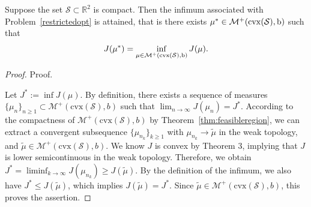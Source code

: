 \documentclass[stsy,sglanonrev]{informs4}
\newcommand{\death}{{\beta}}
\begin{document}
\begin{theorem}\label{thm:existence} Suppose the set $\mathcal{S} \subset \mathbb{R}^2$ is compact. Then the infimum associated with Problem~\eqref{restrictedopt} is attained, that is there exists $\mu^* \in \mathcal{M}^+(\rm{cvx}(\mathcal{S}),b)$ such that $$J(\mu^*) = \inf_{\mu \in \mathcal{M}^+(\rm{cvx}(\mathcal{S}),b)} J(\mu).$$

\end{theorem}
\begin{proof}{Proof.} 

Let \( J^* := \inf J(\mu) \). By definition, there exists a sequence of measures \( \{\mu_n\}_{n \geq 1} \subset \mathcal{M}^+(\mathrm{cvx}(\mathcal{S}),b) \) such that $\lim_{n\to\infty}J(\mu_n) = J^*.$ According to the compactness of \( \mathcal{M}^+(\mathrm{cvx}(\mathcal{S}),b) \) by Theorem~\ref{thm:feasibleregion}, we can extract a convergent subsequence \( \{\mu_{n_k}\}_{k \geq 1} \) with $
\mu_{n_k} \to \tilde{\mu}$  in the weak topology, and $\tilde{\mu} \in \mathcal{M}^+(\mathrm{cvx}(\mathcal{S}),b)$.
We know \( J \) is convex by Theorem 3, implying that \( J \) is lower semicontinuous in the weak topology. Therefore, we obtain $J^* = \liminf_{k \to \infty} J(\mu_{n_k}) \geq J(\tilde{\mu}).$
By the definition of the infimum, we also have $J^* \leq J(\tilde{\mu})$, which implies $J(\tilde{\mu}) = J^*.$
Since \( \tilde{\mu} \in \mathcal{M}^+(\mathrm{cvx}(\mathcal{S}),b) \), this proves the assertion.
\hfill \Halmos
\end{proof} 
\end{document}
